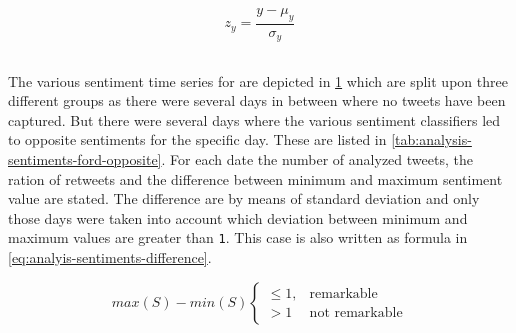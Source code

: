 \begin{equation}
    z_y = \frac{y - \mu_y}{\sigma_y}
    \label{eq:analysis-sentiments-normalization}
\end{equation}


\subsection{\ford}
\label{ss:analysis-sentiments-ford}

The various sentiment time series for \ford{} are depicted in \cref{fig:analysis-sentiments-ford} which are split upon three different groups as there were several days in between where no tweets have been captured.
But there were several days where the various sentiment classifiers led to opposite sentiments for the specific day.
These are listed in \cref{tab:analysis-sentiments-ford-opposite}.
For each date the number of analyzed tweets, the ration of retweets and the difference between minimum and maximum sentiment value are stated.
The difference are by means of standard deviation and only those days were taken into account which deviation between minimum and maximum values are greater than \texttt{1}.
This case is also written as formula in \cref{eq:analyis-sentiments-difference}.

\begin{equation}
    max(S)-min(S)
    \begin{cases}
		\leq 1, & \text{remarkable} \\
		> 1  & \text{not remarkable}
    \end{cases}
    \label{eq:analyis-sentiments-difference}
\end{equation}

\begin{figure}[hbt]
    \centering
    
    \caption{\sentimentsCaption{\ford}}
    \label{fig:analysis-sentiments-ford}
\end{figure} 


